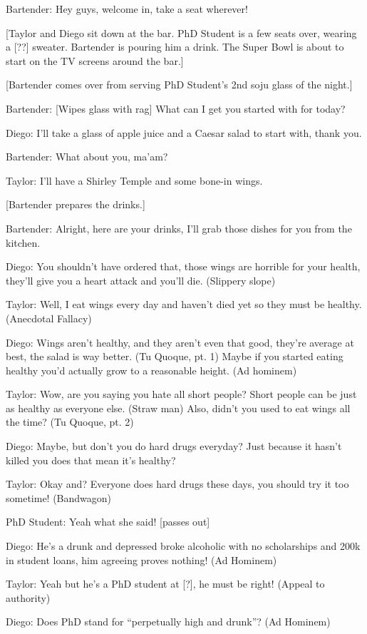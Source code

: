 \documentclass{article}
\begin{document}
Bartender: Hey guys, welcome in, take a seat wherever!

[Taylor and Diego sit down at the bar. PhD Student is a few seats over, wearing a [??] sweater. Bartender is pouring him a drink. The Super Bowl is about to start on the TV screens around the bar.]

[Bartender comes over from serving PhD Student’s 2nd soju glass of the night.]

Bartender: [Wipes glass with rag] What can I get you started with for today?

Diego: I’ll take a glass of apple juice and a Caesar salad to start with, thank you.

Bartender: What about you, ma’am?

Taylor: I’ll have a Shirley Temple and some bone-in wings.

[Bartender prepares the drinks.]

Bartender: Alright, here are your drinks, I’ll grab those dishes for you from the kitchen.

Diego: You shouldn’t have ordered that, those wings are horrible for your health, they’ll give you a heart attack and you’ll die. (Slippery slope)

Taylor: Well, I eat wings every day and haven’t died yet so they must be healthy. (Anecdotal Fallacy)

Diego: Wings aren’t healthy, and they aren’t even that good, they’re average at best, the salad is way better. (Tu Quoque, pt. 1) Maybe if you started eating healthy you’d actually grow to a reasonable height. (Ad hominem)

Taylor: Wow, are you saying you hate all short people? Short people can be just as healthy as everyone else. (Straw man) Also, didn’t you used to eat wings all the time? (Tu Quoque, pt. 2)

Diego: Maybe, but don’t you do hard drugs everyday? Just because it hasn’t killed you does that mean it's healthy? 

Taylor: Okay and? Everyone does hard drugs these days, you should try it too sometime! (Bandwagon)

PhD Student: Yeah what she said! [passes out]

Diego: He’s a drunk and depressed broke alcoholic with no scholarships and 200k in student loans, him agreeing proves nothing! (Ad Hominem)

Taylor: Yeah but he’s a PhD student at [?], he must be right! (Appeal to authority)

Diego: Does PhD stand for “perpetually high and drunk”? (Ad Hominem)
\end{document}
